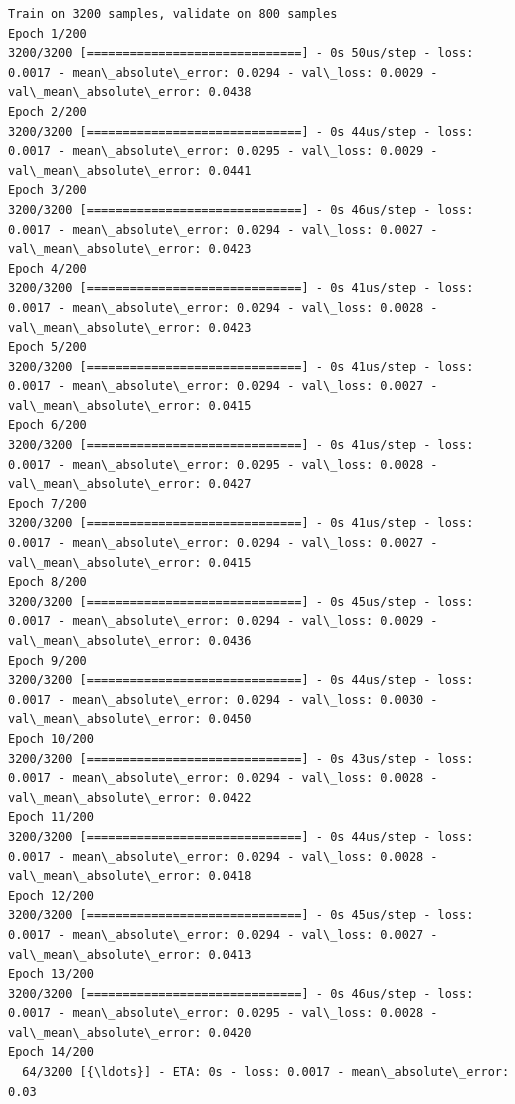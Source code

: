 \documentclass[11pt]{article}
\begin{document}
    \begin{Verbatim}[commandchars=\\\{\}]
Train on 3200 samples, validate on 800 samples
Epoch 1/200
3200/3200 [==============================] - 0s 50us/step - loss: 0.0017 - mean\_absolute\_error: 0.0294 - val\_loss: 0.0029 - val\_mean\_absolute\_error: 0.0438
Epoch 2/200
3200/3200 [==============================] - 0s 44us/step - loss: 0.0017 - mean\_absolute\_error: 0.0295 - val\_loss: 0.0029 - val\_mean\_absolute\_error: 0.0441
Epoch 3/200
3200/3200 [==============================] - 0s 46us/step - loss: 0.0017 - mean\_absolute\_error: 0.0294 - val\_loss: 0.0027 - val\_mean\_absolute\_error: 0.0423
Epoch 4/200
3200/3200 [==============================] - 0s 41us/step - loss: 0.0017 - mean\_absolute\_error: 0.0294 - val\_loss: 0.0028 - val\_mean\_absolute\_error: 0.0423
Epoch 5/200
3200/3200 [==============================] - 0s 41us/step - loss: 0.0017 - mean\_absolute\_error: 0.0294 - val\_loss: 0.0027 - val\_mean\_absolute\_error: 0.0415
Epoch 6/200
3200/3200 [==============================] - 0s 41us/step - loss: 0.0017 - mean\_absolute\_error: 0.0295 - val\_loss: 0.0028 - val\_mean\_absolute\_error: 0.0427
Epoch 7/200
3200/3200 [==============================] - 0s 41us/step - loss: 0.0017 - mean\_absolute\_error: 0.0294 - val\_loss: 0.0027 - val\_mean\_absolute\_error: 0.0415
Epoch 8/200
3200/3200 [==============================] - 0s 45us/step - loss: 0.0017 - mean\_absolute\_error: 0.0294 - val\_loss: 0.0029 - val\_mean\_absolute\_error: 0.0436
Epoch 9/200
3200/3200 [==============================] - 0s 44us/step - loss: 0.0017 - mean\_absolute\_error: 0.0294 - val\_loss: 0.0030 - val\_mean\_absolute\_error: 0.0450
Epoch 10/200
3200/3200 [==============================] - 0s 43us/step - loss: 0.0017 - mean\_absolute\_error: 0.0294 - val\_loss: 0.0028 - val\_mean\_absolute\_error: 0.0422
Epoch 11/200
3200/3200 [==============================] - 0s 44us/step - loss: 0.0017 - mean\_absolute\_error: 0.0294 - val\_loss: 0.0028 - val\_mean\_absolute\_error: 0.0418
Epoch 12/200
3200/3200 [==============================] - 0s 45us/step - loss: 0.0017 - mean\_absolute\_error: 0.0294 - val\_loss: 0.0027 - val\_mean\_absolute\_error: 0.0413
Epoch 13/200
3200/3200 [==============================] - 0s 46us/step - loss: 0.0017 - mean\_absolute\_error: 0.0295 - val\_loss: 0.0028 - val\_mean\_absolute\_error: 0.0420
Epoch 14/200
  64/3200 [{\ldots}] - ETA: 0s - loss: 0.0017 - mean\_absolute\_error: 0.03
    \end{Verbatim}
\end{document}
